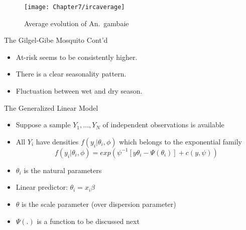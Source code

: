 \documentclass{beamer}
\begin{document}
\begin{frame}
\begin{figure}[h!]
\centering
\texttt{[image: Chapter7/ircaverage]}
\caption{Average evolution of An.~gambaie \label{ircbyvillage}}
\end{figure}
\end{frame}

\begin{frame}{The Gilgel-Gibe Mosquito Cont'd}
\begin{itemize}
\item At-risk seems to be consistently higher. \vspace{0.25cm}
\item There is a clear seasonality pattern. \vspace{0.25cm}
\item Fluctuation between wet and dry season.
\end{itemize}
\end{frame}

\begin{frame}{The Generalized Linear Model}
\begin{itemize}
\item Suppose a sample $Y_1, \dots, Y_N$ of independent observations is available
\item All $Y_i$ have densities $f(y_i|\theta_i, \phi)$ which belongs to the exponential family
\[f(y_i|\theta_i, \phi)=exp\left(\psi^{-1}[y\theta_i-\Psi(\theta_i)]+c(y,\psi)\right)\]
\item $\theta_i$ is the natural parameters
\item Linear predictor: $\theta_i=x_i\beta$
\item $\theta$ is the scale parameter (over dispersion parameter)
\item $\Psi(.)$ is a function to be discussed next
\end{itemize}
\end{frame}
\end{document}
